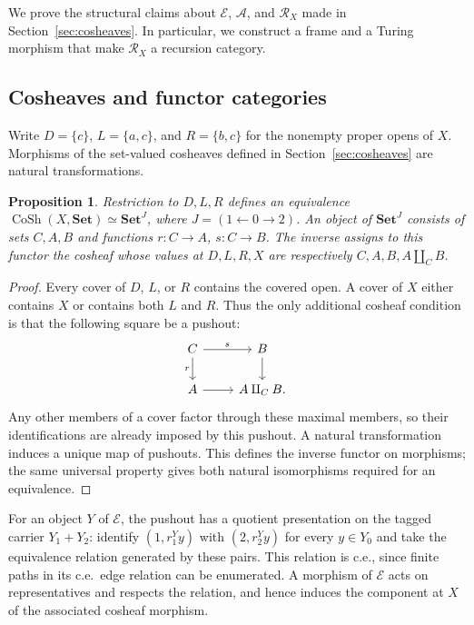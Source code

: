 \documentclass[11pt]{article}
\newtheorem{proposition}[theorem]{Proposition}
\begin{document}
We prove the structural claims about $\mathcal E$, $\mathcal A$, and
$\mathscr R_X$ made in Section~\ref{sec:cosheaves}. In particular,
we construct a frame and a Turing morphism that make
$\mathscr R_X$ a recursion category.

\subsection{Cosheaves and functor categories}

Write $D=\{c\}$, $L=\{a,c\}$, and $R=\{b,c\}$ for the nonempty
proper opens of $X$. Morphisms of the set-valued cosheaves defined in
Section~\ref{sec:cosheaves} are natural transformations.

\begin{proposition}\label{prop:fork-cosheaves}
Restriction to $D,L,R$ defines an equivalence
$\operatorname{CoSh}(X,\mathbf{Set})\simeq\mathbf{Set}^{J}$,
where $J=(1\leftarrow0\to2)$. An object of $\mathbf{Set}^{J}$
consists of sets $C,A,B$ and functions $r:C\to A$, $s:C\to B$.
The inverse assigns to this functor the cosheaf whose values at
$D,L,R,X$ are respectively $C,A,B,A\amalg_C B$.
\end{proposition}
\begin{proof}
Every cover of $D$, $L$, or $R$ contains the covered open. A cover
of $X$ either contains $X$ or contains both $L$ and $R$. Thus the
only additional cosheaf condition is that the following square be
a pushout:
\[
\begin{tikzcd}
C\arrow[r,"s"]\arrow[d,"r"']&B\arrow[d]\\
A\arrow[r]&A\amalg_C B.
\end{tikzcd}
\]
Any other members of a cover factor through these maximal members,
so their identifications are already imposed by this pushout.
A natural transformation induces a unique map of pushouts.
This defines the inverse functor on morphisms; the same universal
property gives both natural isomorphisms required for an equivalence.
\end{proof}

For an object $Y$ of $\mathcal E$, the pushout has a
quotient presentation on the tagged carrier $Y_1+Y_2$: identify
$(1,r_1^Yy)$ with $(2,r_2^Yy)$ for every $y\in Y_0$ and take the
equivalence relation generated by these pairs. This relation is c.e.,
since finite paths in its c.e.\ edge relation can be enumerated.
A morphism of $\mathcal E$ acts on representatives and respects the
relation, and hence induces the component at $X$ of the associated
cosheaf morphism.
\end{document}
